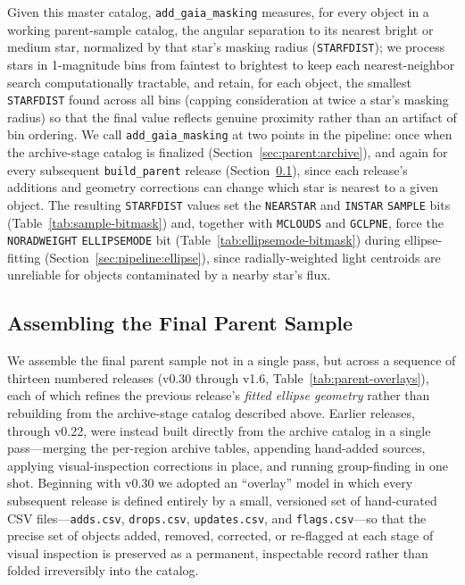 \documentclass[modern,linenumbers]{aastex701}
\begin{document}
Given this master catalog, \texttt{add\_gaia\_masking} measures, for
every object in a working parent-sample catalog, the angular
separation to its nearest bright or medium star, normalized by that
star's masking radius (\texttt{STARFDIST}); we process stars in
1-magnitude bins from faintest to brightest to keep each
nearest-neighbor search computationally tractable, and retain, for
each object, the smallest \texttt{STARFDIST} found across all bins
(capping consideration at twice a star's masking radius) so that the
final value reflects genuine proximity rather than an artifact of bin
ordering. We call \texttt{add\_gaia\_masking} at two points in the
pipeline: once when the archive-stage catalog is finalized
(Section~\ref{sec:parent:archive}), and again for every subsequent
\texttt{build\_parent} release (Section~\ref{sec:parent:final}), since
each release's additions and geometry corrections can change which
star is nearest to a given object. The resulting \texttt{STARFDIST}
values set the \texttt{NEARSTAR} and \texttt{INSTAR} \texttt{SAMPLE}
bits (Table~\ref{tab:sample-bitmask}) and, together with
\texttt{MCLOUDS} and \texttt{GCLPNE}, force the \texttt{NORADWEIGHT}
\texttt{ELLIPSEMODE} bit (Table~\ref{tab:ellipsemode-bitmask}) during
ellipse-fitting (Section~\ref{sec:pipeline:ellipse}), since
radially-weighted light centroids are unreliable for objects
contaminated by a nearby star's flux.



\subsection{Assembling the Final Parent Sample}
\label{sec:parent:final}

We assemble the final parent sample not in a single pass, but across a
sequence of thirteen numbered releases (v0.30 through v1.6,
Table~\ref{tab:parent-overlays}), each of which refines the previous
release's \emph{fitted ellipse geometry} rather than rebuilding from the
archive-stage catalog described above. Earlier releases, through
v0.22, were instead built directly from the archive catalog in a single
pass---merging the per-region archive tables, appending hand-added
sources, applying visual-inspection corrections in place, and running
group-finding in one shot. Beginning with v0.30 we adopted an
``overlay'' model in which every subsequent release is defined entirely
by a small, versioned set of hand-curated CSV files---\texttt{adds.csv},
\texttt{drops.csv}, \texttt{updates.csv}, and \texttt{flags.csv}---so
that the precise set of objects added, removed, corrected, or re-flagged
at each stage of visual inspection is preserved as a permanent,
inspectable record rather than folded irreversibly into the catalog.
\end{document}
